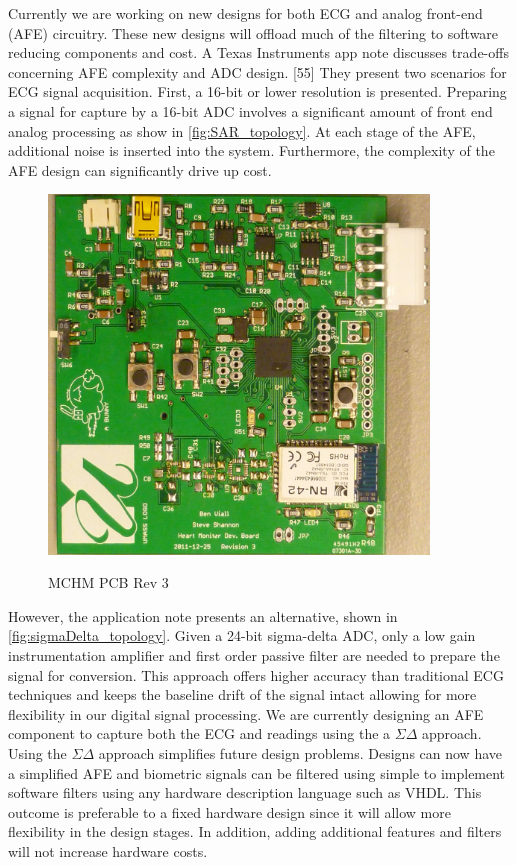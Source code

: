 Currently we are working on new designs for both ECG and  analog front-end (AFE) circuitry. These new designs will offload much of the filtering to software reducing components and cost. A Texas Instruments app note discusses trade-offs concerning AFE complexity and ADC design. [55] They present two scenarios for ECG signal acquisition. First, a 16-bit or lower resolution is presented. Preparing a signal for capture by a 16-bit ADC involves a significant amount of front end analog processing as show in \cref{fig:SAR_topology}.\cite{Soundarapandian2010} At each stage of the AFE, additional noise is inserted into the system. Furthermore, the complexity of the AFE design can significantly drive up cost.

\begin{figure}
	\begin{center}
		\label{fig:PCB_Rev3}
		\includegraphics[scale=1,width=0.9\textwidth]{Images/PCB_Rev3.jpg} 
		\caption{MCHM PCB Rev 3}
	\end{center}
\end{figure}

However, the application note presents an alternative, shown in \cref{fig:sigmaDelta_topology}. \cite{Soundarapandian2010} Given a 24-bit sigma-delta ADC, only a low gain instrumentation amplifier and first order passive filter are needed to prepare the signal for conversion.  This approach offers higher accuracy than traditional ECG techniques and keeps the baseline drift of the signal intact allowing for more flexibility in our digital signal processing. We are currently designing an AFE component to capture both the ECG and  readings using the a $ \Sigma\Delta $ approach. Using the $ \Sigma\Delta $ approach simplifies future design problems. Designs can now have a simplified AFE and biometric signals can be filtered using simple to implement software filters using any hardware description language such as VHDL. This outcome is preferable to a fixed hardware design since it will allow more flexibility in the design stages. In addition, adding additional features and filters will not increase hardware costs.


